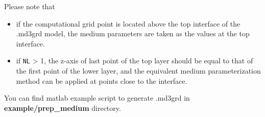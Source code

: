 Please note that
\begin{itemize}
  \item if the computational grid point is located above the top interface of the .md3grd model,
the medium parameters are taken as the values at the top interface.
  \item if \texttt{NL} > 1, the z-axis of last point of the top layer should be equal to that of
    the first point of the lower layer,
    and the equivalent medium parameterization method can be applied at points close to the interface.
\end{itemize}

You can find matlab example script to generate .md3grd in \textbf{example/prep\_medium} directory.
